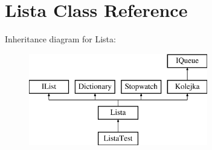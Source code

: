 \hypertarget{class_lista}{\section{Lista Class Reference}
\label{class_lista}
}
Inheritance diagram for Lista\-:\begin{figure}[H]
\begin{center}
\leavevmode
\includegraphics[height=4.000000cm]{class_lista}
\end{center}
\end{figure}
